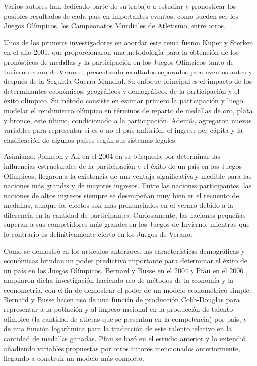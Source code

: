 Varios autores han dedicado parte de su trabajo a estudiar y pronosticar los posibles resultados de cada país en importantes eventos, como pueden ser los Juegos Olímpicos, los Campeonatos Mundiales de Atletismo, entre otros.

Unos de los primeros investigadores en abordar este tema fueron Kuper y Sterken en el año 2001, que proporcionaron una metodología para la obtención de los pronósticos de medallas y la participación en los Juegos Olímpicos tanto de Invierno \cite{kuper2001olympic} como de Verano \cite{kuperolympicgerard}, presentando resultados separados para eventos antes y después de la Segunda Guerra Mundial. Su enfoque principal es el impacto de los determinantes económicos, geográficos y demográficos de la participación y el éxito olímpico. Su método consiste en estimar primero la participación y luego modelar el rendimiento olímpico en términos de reparto de medallas de oro, plata y bronce, este último, condicionado a la participación. Además, agregaron nuevas variables para representar si es o no el país anfitrión, el ingreso per cápita y la clasificación de algunos países según sus sistemas legales.

Asimismo, Johnson y Ali en el 2004 \cite{johnson2004tale} en su búsqueda por determinar las influencias estructurales de la participación y el éxito de un país en los Juegos Olímpicos, llegaron a la existencia de una ventaja significativa y medible para las naciones más grandes y de mayores ingresos. Entre las naciones participantes, las naciones de altos ingresos siempre se desempeñan muy bien en el recuento de medallas, aunque los efectos son más pronunciados en el verano debido a la diferencia en la cantidad de participantes. Curiosamente, las naciones pequeñas superan a sus competidores más grandes en los Juegos de Invierno, mientras que lo contrario es definitivamente cierto en los Juegos de Verano. 

Como se demostró en los artículos anteriores, las características demográficas y económicas brindan un poder predictivo importante para determinar el éxito de un país en los Juegos Olímpicos. Bernard y Busse en el 2004 \cite{bernard2004wins} y Pfau en el 2006 \cite{pfau2006predicting}, ampliaron dicha investigación haciendo uso de métodos de la economía y la econometría, con el fin de demostrar el poder de un modelo econométrico simple. Bernard y Busse hacen uso de una función de producción Cobb-Douglas para representar a la población y al ingreso nacional en la producción de talento olímpico (la cantidad de atletas que se presentan en la competencia) por país, y de una función logarítmica para la traducción de este talento relativo en la cantidad de medallas ganadas. Pfau se basó en el estudio anterior y lo extendió añadiendo variables propuestas por otros autores mencionados anteriormente, llegando a construir un modelo más completo.

